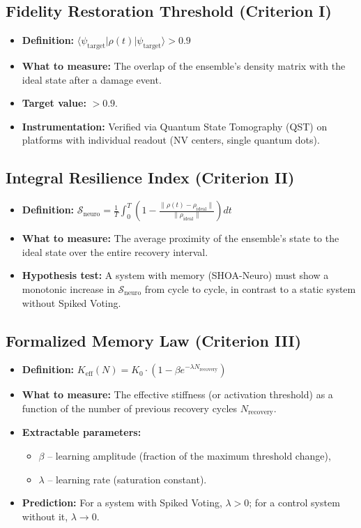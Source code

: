 \documentclass[12pt]{article}
\begin{document}
\subsection{Fidelity Restoration Threshold (Criterion I)}
\begin{itemize}
    \item \textbf{Definition:} $\langle \psi_{\text{target}} | \rho(t) | \psi_{\text{target}} \rangle > 0.9$
    \item \textbf{What to measure:} The overlap of the ensemble's density matrix with the ideal state after a damage event.
    \item \textbf{Target value:} $> 0.9$.
    \item \textbf{Instrumentation:} Verified via Quantum State Tomography (QST) on platforms with individual readout (NV centers, single quantum dots).
\end{itemize}

\subsection{Integral Resilience Index (Criterion II)}
\begin{itemize}
    \item \textbf{Definition:} $\mathcal{S}_{\text{neuro}} = \frac{1}{T} \int_0^T \left(1 - \frac{\| \rho(t) - \rho_{\text{ideal}} \|}{\| \rho_{\text{ideal}} \|} \right) dt$
    \item \textbf{What to measure:} The average proximity of the ensemble's state to the ideal state over the entire recovery interval.
    \item \textbf{Hypothesis test:} A system with memory (SHOA-Neuro) must show a monotonic increase in $\mathcal{S}_{\text{neuro}}$ from cycle to cycle, in contrast to a static system without Spiked Voting.
\end{itemize}

\subsection{Formalized Memory Law (Criterion III)}
\begin{itemize}
    \item \textbf{Definition:} $K_{\text{eff}}(N) = K_0 \cdot \left(1 - \beta e^{-\lambda N_{\text{recovery}}} \right)$
    \item \textbf{What to measure:} The effective stiffness (or activation threshold) as a function of the number of previous recovery cycles $N_{\text{recovery}}$.
    \item \textbf{Extractable parameters:}
        \begin{itemize}
            \item $\beta$ -- learning amplitude (fraction of the maximum threshold change),
            \item $\lambda$ -- learning rate (saturation constant).
        \end{itemize}
    \item \textbf{Prediction:} For a system with Spiked Voting, $\lambda > 0$; for a control system without it, $\lambda \to 0$.
\end{itemize}
\end{document}
